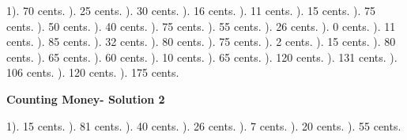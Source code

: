 \documentclass{article}%
\begin{document}
1). 70 cents.%
). 25 cents.%
). 30 cents.%
). 16 cents.%
). 11 cents.%
). 15 cents.%
). 75 cents.%
). 50 cents.%
). 40 cents.%
). 75 cents.%
). 55 cents.%
). 26 cents.%
). 0 cents.%
). 11 cents.%
). 85 cents.%
). 32 cents.%
). 80 cents.%
). 75 cents.%
). 2 cents.%
). 15 cents.%
). 80 cents.%
). 65 cents.%
). 60 cents.%
). 10 cents.%
). 65 cents.%
). 120 cents.%
). 131 cents.%
). 106 cents.%
). 120 cents.%
). 175 cents.%
\newline%
\newpage%
\large%
\begin{center}%
\textbf{Counting Money- Solution 2}%
\newline%
\end{center} \normalsize%
1). 15 cents.%
). 81 cents.%
). 40 cents.%
). 26 cents.%
). 7 cents.%
). 20 cents.%
). 55 cents.%
\end{document}
